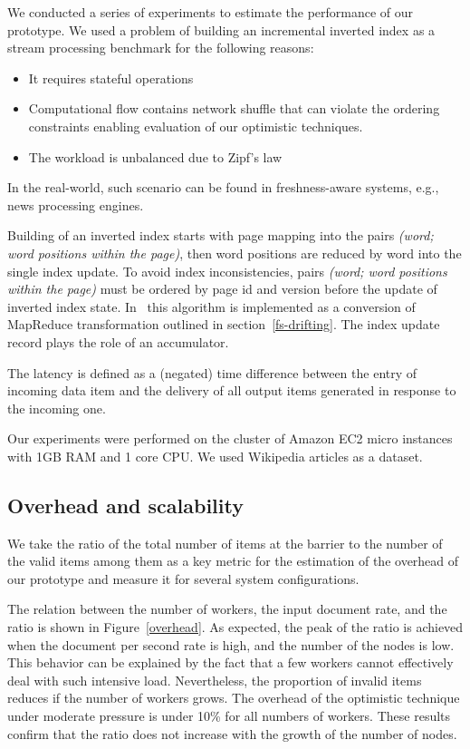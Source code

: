 \label{fs-experiments-section}

We conducted a  series of experiments to estimate the performance of our prototype. We used a problem of building an incremental inverted index as a stream processing benchmark  for the following reasons:

\begin{itemize}
  \item It requires stateful operations
  \item Computational flow contains network shuffle that can violate the ordering constraints enabling evaluation of our optimistic techniques.
  \item The workload is unbalanced due to Zipf's law
\end{itemize}

In the real-world, such scenario can be found in freshness-aware systems, e.g., news processing engines.

Building of an inverted index starts with page mapping into the pairs {\it (word; word positions within the page)}, then  word positions are reduced by word into the single index update. To avoid index inconsistencies, pairs {\it (word; word positions within the page)} must be ordered by page id and version before the update of inverted index state. In \FlameStream\ this algorithm is implemented as a conversion of MapReduce transformation outlined in  section~\ref{fs-drifting}. The index update record plays the role of an accumulator. 

The latency is defined as a (negated) time difference between the entry of incoming data item and the delivery of all output items generated in response to the incoming one.

Our experiments were performed on the cluster of Amazon EC2 micro instances with 1GB RAM and 1 core CPU. We used Wikipedia articles as a dataset. 

\subsection{Overhead and scalability}

We take the ratio of  the total number of items at the barrier   to the number of the valid items among them as a key metric for the estimation of the overhead of our prototype and measure it for several system configurations.

The relation between the number of workers, the input  document  rate, and the  ratio is shown in Figure~\ref{overhead}. As expected, the peak of the ratio is achieved when the document per second rate is high, and the number of the nodes is low. This behavior can be explained by the fact that a few workers cannot effectively deal with such intensive load. Nevertheless, the proportion of invalid items reduces if the number of workers grows. The overhead of the optimistic technique under moderate pressure  is under 10\% for all  numbers of workers. These results confirm that the ratio does not increase with the growth of the number of nodes.

